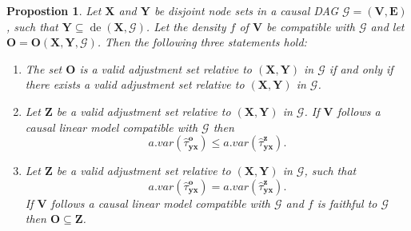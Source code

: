 \documentclass[11pt,a4paper]{article}
\newtheorem{Proposition}[Satz]{Propostion}
\theoremstyle{definition}
\theoremstyle{remark}
\DeclareMathOperator{\de}{de}
\newcommand{\g}[1][G]{\mathcal{#1}}
\newcommand{\optb}[2][X,Y]{\mathbf{O}(\mathbf{#1},#2)}
\begin{document}
\begin{Proposition}
	Let $\mathbf{X}$ and $\mathbf{Y}$ be disjoint node sets in a causal DAG $\g=(\mathbf{V},\mathbf{E})$, such that $\mathbf{Y} \subseteq \de(\mathbf{X},\g)$. Let the density $f$ of $\mathbf{V}$ be compatible with $\g$ and let $\mathbf{O}=\optb{\g}$. Then the following three statements hold:
	\begin{enumerate}[label = (\alph*)]
		\item The set $\mathbf{O}$ is a valid adjustment set relative to $(\mathbf{X,Y})$ in $\g$ if and only if there exists a valid adjustment set relative to $(\mathbf{X,Y})$ in $\g$. 
		\label{VAS}
		\item Let $\mathbf{Z}$ be a valid adjustment set relative to $(\mathbf{X},\mathbf{Y})$ in $\g$. If $\mathbf{V}$ follows a causal linear model compatible with $\g$ then
		\[
		a.var(\hat{\tau}^{\mathbf{o}}_{\mathbf{yx}}) \leq a.var(\hat{\tau}^{\mathbf{z}}_{\mathbf{yx}}).
		\]
		\label{optimal} 
		\item Let $\mathbf{Z}$ be a valid adjustment set relative to $(\mathbf{X},\mathbf{Y})$ in $\g$, such that 
		\[
		a.var(\hat{\tau}^{\mathbf{o}}_{\mathbf{yx}}) = a.var(\hat{\tau}^{\mathbf{z}}_{\mathbf{yx}}).
		\]
		If $\mathbf{V}$ follows a causal linear model compatible with $\g$ and $f$ is faithful to $\g$ then $\mathbf{O} \subseteq \mathbf{Z}$. 
		\label{smallest}
	\end{enumerate}
	
	\label{almost}
\end{Proposition}
\end{document}
